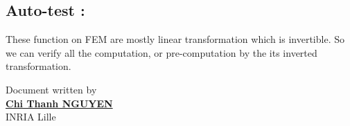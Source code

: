 \documentclass[a4paper,10pt]{article}
\begin{document}
\subsection{Auto-test : }
These function on FEM are mostly linear transformation which is invertible. So we can verify all the computation, or pre-computation by the its inverted transformation. 

						      \begin{flushright}
						      Document written by \\
						      \href{mailto:chi-thanh.nguyen@inria.fr}{{\textbf {Chi Thanh NGUYEN}}} \\
						      INRIA Lille
						      \end{flushright}
\end{document}
